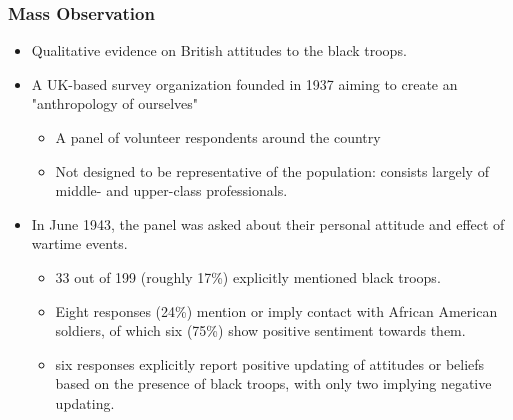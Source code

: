 \documentclass[dvipdfmx,11pt]{beamer}
\begin{document}
\begin{frame}\frametitle{Mass Observation}
  \begin{itemize}
    \item Qualitative evidence on British attitudes to the black troops.
    \item A UK-based survey organization founded in 1937 aiming to create an "anthropology of ourselves"
    \begin{itemize}
      \item A panel of volunteer respondents around the country
      \item Not designed to be representative of the population: consists largely of middle- and upper-class professionals.
    \end{itemize}
    \item In June 1943, the panel was asked about their personal attitude and effect of wartime events.
    \begin{itemize}
      \item 33 out of 199 (roughly 17\%) explicitly mentioned black troops.
      \item Eight responses (24\%) mention or imply contact with African American soldiers, of which six (75\%) show positive sentiment towards them.
      \item six responses explicitly report positive updating of attitudes or beliefs based on the presence of black troops, with only two implying negative updating.
    \end{itemize}
  \end{itemize}
\end{frame}
\end{document}
